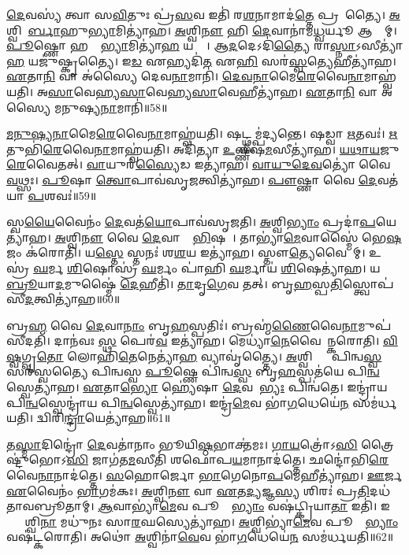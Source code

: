 \ul{𑌦𑍇}𑌵𑌸𑍍𑌯॑ 𑌤𑍍𑌵𑌾 𑌸\ul{𑌵𑌿}𑌤𑍁𑌃 𑌪𑍍𑌰॑\ul{𑌸}𑌵 𑌇𑌤𑌿॑ 𑌰\ul{𑌶}𑌨𑌾𑌮𑌾𑌦॑\ul{𑌤𑍍𑌤𑍇} 𑌪𑍍𑌰𑌸𑍂᳚𑌤𑍍𑌯𑍈। 
\ul{𑌅}𑌶𑍍𑌵𑌿𑌨𑍋᳚\ul{𑌰𑍍𑌬𑌾}𑌹𑍁\ul{𑌭𑍍𑌯𑌾}𑌮𑌿𑌤𑍍𑌯𑌾॑𑌹। 
\ul{𑌅}𑌶𑍍𑌵𑌿\ul{𑌨𑍗} 𑌹𑌿 \ul{𑌦𑍇}𑌵𑌾𑌨𑌾॑𑌮\ul{𑌧𑍍𑌵}𑌰𑍍𑌯𑍂 𑌆𑌸𑍍𑌤𑌾᳚𑌮𑍍। 
\ul{𑌪𑍂}𑌷𑍍𑌣𑍋 𑌹𑌸𑍍𑌤𑌾᳚\ul{𑌭𑍍𑌯𑌾}𑌮𑌿𑌤𑍍𑌯𑌾॑\ul{𑌹} 𑌯𑌤𑍍𑌯𑍈᳚। 
𑌆\ul{𑌦}𑌦𑍇𑌽𑌦𑌿॑\ul{𑌤𑍍𑌯𑍈} 𑌰𑌾\ul{𑌸𑍍𑌨𑌾}𑌽𑌸𑍀𑌤𑍍𑌯𑌾॑\ul{𑌹} 𑌯𑌜𑍁॑𑌷𑍍𑌕𑍃𑌤𑍍𑌯𑍈। 
𑌇\ul{𑌡} 𑌏𑌹𑍍𑌯𑌦𑌿॑\ul{𑌤} 𑌏\ul{𑌹𑌿} 𑌸𑌰॑\ul{𑌸𑍍𑌵}𑌤𑍍𑌯𑍇𑌹𑍀𑌤𑍍𑌯𑌾॑𑌹। 
\ul{𑌏}𑌤𑌾\ul{𑌨𑌿} 𑌵𑌾 𑌅॑𑌸𑍍𑌯𑍈 𑌦𑍇𑌵\ul{𑌨𑌾}𑌮𑌾𑌨𑌿॑। 
\ul{𑌦𑍇}\ul{𑌵}\ul{𑌨𑌾}𑌮𑍈\ul{𑌰𑍇}𑌵𑍈\ul{𑌨𑌾}𑌮𑌾𑌹𑍍𑌵॑𑌯𑌤𑌿। 
𑌅\ul{𑌸𑌾}𑌵𑍇𑌹𑍍𑌯\ul{𑌸𑌾}𑌵𑍇𑌹𑍍𑌯\ul{𑌸𑌾}𑌵𑍇𑌹𑍀𑌤𑍍𑌯𑌾॑𑌹। 
\ul{𑌏}𑌤𑌾\ul{𑌨𑌿} 𑌵𑌾 𑌅॑𑌸𑍍𑌯𑍈 𑌮𑌨𑍁𑌷𑍍𑌯\ul{𑌨𑌾}𑌮𑌾𑌨𑌿॑॥58॥

\ul{𑌮}\ul{𑌨𑍁}\ul{𑌷𑍍𑌯}\ul{𑌨𑌾}𑌮𑍈\ul{𑌰𑍇}𑌵𑍈\ul{𑌨𑌾}𑌮𑌾𑌹𑍍𑌵॑𑌯𑌤𑌿। 
𑌷𑌟𑍍𑌥𑍍𑌸𑌮𑍍𑌪॑𑌦𑍍𑌯𑌨𑍍𑌤𑍇। 
𑌷𑌡𑍍𑌵𑌾 \ul{𑌋}𑌤𑌵𑌃॑। 
\ul{𑌋}𑌤𑍁𑌭𑌿॑\ul{𑌰𑍇}𑌵𑍈\ul{𑌨𑌾}𑌮𑌾𑌹𑍍𑌵॑𑌯𑌤𑌿। 
𑌅𑌦𑌿॑𑌤𑍍𑌯𑌾 \ul{𑌉}𑌷𑍍𑌣𑍀𑌷॑\ul{𑌮}𑌸𑍀𑌤𑍍𑌯𑌾॑𑌹। 
\ul{𑌯}\ul{𑌥𑌾}\ul{𑌯}𑌜𑍁\ul{𑌰𑍇}𑌵𑍈𑌤𑌤𑍍। 
\ul{𑌵𑌾}𑌯𑍁𑌰॑\ul{𑌸𑍍𑌯𑍈}𑌡 𑌇𑌤𑍍𑌯𑌾॑𑌹। 
\ul{𑌵𑌾}\ul{𑌯𑍁}\ul{𑌦𑍇}\ul{𑌵}𑌤𑍍𑌯𑍋॑ 𑌵𑍈 \ul{𑌵}𑌥𑍍𑌸𑌃। 
\ul{𑌪𑍂}𑌷𑌾 \ul{𑌤𑍍𑌵𑍋}𑌪𑌾𑌵॑𑌸𑍃\ul{𑌜}𑌤𑍍𑌵𑌿𑌤𑍍𑌯𑌾॑𑌹। 
\ul{𑌪𑍗}𑌷𑍍𑌣𑌾 𑌵𑍈 \ul{𑌦𑍇}𑌵𑌤॑𑌯𑌾 \ul{𑌪}𑌶𑌵𑌃॑॥59॥

𑌸𑍍𑌵\ul{𑌯𑍈}𑌵𑍈𑌨𑌂॑ \ul{𑌦𑍇}𑌵𑌤॑\ul{𑌯𑍋}𑌪𑌾𑌵॑𑌸𑍃𑌜𑌤𑌿। 
\ul{𑌅}𑌶𑍍𑌵𑌿\ul{𑌭𑍍𑌯𑌾𑌂} 𑌪𑍍𑌰𑌦𑌾॑\ul{𑌪}𑌯𑍇𑌤𑍍𑌯𑌾॑𑌹। 
\ul{𑌅}𑌶𑍍𑌵𑌿\ul{𑌨𑍗} 𑌵𑍈 \ul{𑌦𑍇}𑌵𑌾𑌨𑌾𑌂᳚ \ul{𑌭𑌿}𑌷𑌜𑍗᳚। 
𑌤𑌾𑌭𑍍𑌯𑌾॑\ul{𑌮𑍇}𑌵𑌾𑌸𑍍𑌮𑍈॑ 𑌭𑍇\ul{𑌷}𑌜𑌂 𑌕॑𑌰𑍋𑌤𑌿। 
𑌯\ul{𑌸𑍍𑌤𑍇} 𑌸𑍍𑌤𑌨𑌃॑ 𑌶\ul{𑌶}𑌯 𑌇𑌤𑍍𑌯𑌾॑𑌹। 
𑌸𑍍𑌤𑍗\ul{𑌤𑍍𑌯𑍇}𑌵𑍈𑌨𑌾᳚𑌮𑍍। 
𑌉𑌸𑍍𑌰॑ \ul{𑌘}𑌰𑍍𑌮 \ul{𑌶𑌿}\ul{}𑌷𑍋𑌸𑍍𑌰॑ \ul{𑌘}𑌰𑍍𑌮𑌂 𑌪𑌾॑𑌹𑌿 \ul{𑌘}𑌰𑍍𑌮𑌾𑌯॑ \ul{𑌶𑌿}\ul{}𑌷𑍇𑌤𑍍𑌯𑌾॑𑌹। 
𑌯𑌥𑌾᳚ \ul{𑌬𑍍𑌰𑍂}𑌯𑌾\ul{𑌦}𑌮𑍁𑌷𑍍𑌮𑍈॑ \ul{𑌦𑍇}𑌹𑍀𑌤𑌿॑। 
\ul{𑌤𑌾}𑌦𑍃\ul{𑌗𑍇}𑌵 𑌤𑌤𑍍। 
𑌬𑍃\ul{𑌹}𑌸𑍍𑌪\ul{𑌤𑌿}𑌸𑍍𑌤𑍍𑌵𑍋𑌪॑ 𑌸𑍀\ul{𑌦}𑌤𑍍𑌵𑌿𑌤𑍍𑌯𑌾॑𑌹॥60॥

𑌬𑍍𑌰\ul{𑌹𑍍𑌮} 𑌵𑍈 \ul{𑌦𑍇}𑌵𑌾\ul{𑌨𑌾𑌂} 𑌬𑍃\ul{𑌹}𑌸𑍍𑌪𑌤𑌿𑌃॑। 
𑌬𑍍𑌰𑌹𑍍𑌮॑\ul{𑌣𑍈}𑌵𑍈\ul{𑌨𑌾}𑌮𑍁𑌪॑𑌸𑍀𑌦𑌤𑌿। 
𑌦𑌾𑌨॑𑌵𑌃 \ul{𑌸𑍍𑌥} 𑌪𑍇𑌰॑\ul{𑌵} 𑌇𑌤𑍍𑌯𑌾॑𑌹। 
𑌮𑍇𑌧𑍍𑌯𑌾॑\ul{𑌨𑍇}𑌵𑍈𑌨𑌾᳚𑌨𑍍𑌕𑌰𑍋𑌤𑌿। 
\ul{𑌵𑌿}\ul{𑌷𑍍𑌵}𑌗𑍍𑌵𑍃\ul{𑌤𑍋} 𑌲𑍋𑌹𑌿॑\ul{𑌤𑍇}𑌨𑍇𑌤𑍍𑌯𑌾॑\ul{𑌹} 𑌵𑍍𑌯𑌾𑌵𑍃॑𑌤𑍍𑌤𑍍𑌯𑍈। 
\ul{𑌅}𑌶𑍍𑌵𑌿𑌭𑍍𑌯𑌾𑌂᳚ 𑌪𑌿𑌨𑍍𑌵\ul{𑌸𑍍𑌵} 𑌸𑌰॑𑌸𑍍𑌵𑌤𑍍𑌯𑍈 𑌪𑌿𑌨𑍍𑌵𑌸𑍍𑌵 \ul{𑌪𑍂}𑌷𑍍𑌣𑍇 𑌪𑌿॑𑌨𑍍𑌵\ul{𑌸𑍍𑌵} 𑌬𑍃\ul{𑌹}𑌸𑍍𑌪𑌤॑𑌯𑍇 𑌪𑌿\ul{𑌨𑍍𑌵}𑌸𑍍𑌵𑍇𑌤𑍍𑌯𑌾॑𑌹। 
\ul{𑌏}𑌤𑌾\ul{𑌭𑍍𑌯𑍋} 𑌹𑍍𑌯𑍇॑𑌷𑌾 \ul{𑌦𑍇}𑌵𑌤𑌾᳚\ul{𑌭𑍍𑌯𑌃} 𑌪𑌿𑌨𑍍𑌵॑𑌤𑍇। 
𑌇𑌨𑍍𑌦𑍍𑌰𑌾॑𑌯 𑌪𑌿\ul{𑌨𑍍𑌵}𑌸𑍍𑌵𑍇𑌨𑍍𑌦𑍍𑌰𑌾॑𑌯 𑌪𑌿\ul{𑌨𑍍𑌵}𑌸𑍍𑌵𑍇𑌤𑍍𑌯𑌾॑𑌹। 
𑌇𑌨𑍍𑌦𑍍𑌰॑\ul{𑌮𑍇}𑌵 𑌭𑌾॑\ul{𑌗}𑌧𑍇𑌯𑍇॑\ul{𑌨} 𑌸𑌮॑𑌰𑍍𑌧𑌯𑌤𑌿। 
𑌦𑍍𑌵𑌿𑌰𑌿\ul{𑌨𑍍𑌦𑍍𑌰𑌾}𑌯𑍇𑌤𑍍𑌯𑌾॑𑌹॥61॥

𑌤\ul{𑌸𑍍𑌮𑌾}𑌦𑌿𑌨𑍍𑌦𑍍𑌰𑍋॑ \ul{𑌦𑍇}𑌵𑌤𑌾॑𑌨𑌾𑌂 𑌭𑍂𑌯𑌿\ul{𑌷𑍍𑌠}𑌭𑌾𑌕𑍍𑌤॑𑌮𑌃। 
\ul{𑌗𑌾}\ul{𑌯}𑌤𑍍𑌰𑍋॑𑌽\ul{𑌸𑌿} 𑌤𑍍𑌰𑍈𑌷𑍍𑌟𑍁॑𑌭𑍋𑌽\ul{𑌸𑌿} 𑌜𑌾𑌗॑𑌤\ul{𑌮}𑌸𑍀𑌤𑌿॑ 𑌶𑌫𑍋𑌪\ul{𑌯}𑌮𑌾𑌨𑌾𑌦॑𑌤𑍍𑌤𑍇। 
𑌛𑌨𑍍𑌦𑍋॑𑌭𑌿\-\ul{𑌰𑍇}𑌵𑍈\ul{𑌨𑌾}𑌨𑌾𑌦॑𑌤𑍍𑌤𑍇। 
\ul{𑌸}𑌹𑍋𑌰𑍍𑌜𑍋 \ul{𑌭𑌾}𑌗𑍇𑌨𑍋\ul{𑌪}𑌮𑍇𑌹𑍀𑌤𑍍𑌯𑌾॑𑌹। 
\ul{𑌊}𑌰𑍍𑌜 \ul{𑌏}𑌵𑍈𑌨𑌂॑ \ul{𑌭𑌾}𑌗𑌮॑𑌕𑌃। 
\ul{𑌅}𑌶𑍍𑌵𑌿\ul{𑌨𑍗} 𑌵𑌾 \ul{𑌏}𑌤\ul{𑌦𑍍𑌯}𑌜𑍍𑌞\ul{𑌸𑍍𑌯} 𑌶𑌿𑌰𑌃॑ 𑌪𑍍𑌰\ul{𑌤𑌿}𑌦𑌧॑𑌤𑌾𑌵𑌬𑍍𑌰𑍂𑌤𑌾𑌮𑍍। 
\ul{𑌆}𑌵𑌾𑌭𑍍𑌯𑌾॑\ul{𑌮𑍇}𑌵 𑌪𑍂𑌰𑍍𑌵𑌾᳚\ul{𑌭𑍍𑌯𑌾𑌂} 𑌵𑌷॑𑌟𑍍𑌕𑍍𑌰𑌿𑌯𑌾\ul{𑌤𑌾} 𑌇𑌤𑌿॑। 
𑌇𑌨𑍍𑌦𑍍𑌰𑌾᳚𑌶𑍍𑌵𑌿\ul{𑌨𑌾} 𑌮𑌧𑍁॑𑌨𑌃 𑌸𑌾\ul{𑌰}𑌘𑌸𑍍𑌯𑍇𑌤𑍍𑌯𑌾॑𑌹। 
\ul{𑌅}𑌶𑍍𑌵𑌿𑌭𑍍𑌯𑌾॑\ul{𑌮𑍇}𑌵 𑌪𑍂𑌰𑍍𑌵𑌾᳚\ul{𑌭𑍍𑌯𑌾𑌂} 𑌵𑌷॑𑌟𑍍𑌕𑌰𑍋𑌤𑌿। 
𑌅𑌥𑍋॑ \ul{𑌅}𑌶𑍍𑌵𑌿𑌨𑌾॑\ul{𑌵𑍇}𑌵 𑌭𑌾॑\ul{𑌗}𑌧𑍇𑌯𑍇॑\ul{𑌨} 𑌸𑌮॑𑌰𑍍𑌧𑌯𑌤𑌿॥62॥

